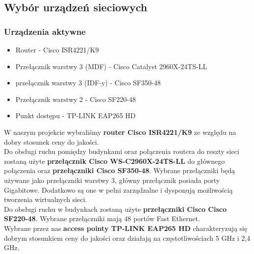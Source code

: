 \documentclass[a4paper,12pt]{extarticle}  %
\begin{document}
\subsection{Wybór urządzeń sieciowych}
\subsubsection{Urządzenia aktywne}
\begin{itemize}
	\item Router - Cisco ISR4221/K9
	\item Przełącznik warstwy 3 (MDF) - Cisco Catalyst 2960X-24TS-LL
	\item przełącznik warstwy 3 (IDF-y) - Cisco SF350-48
	\item Przełącznik warstwy 2 - Cisco SF220-48
	\item Punkt dostępu - TP-LINK EAP265 HD
\end{itemize}
W naszym projekcie wybraliśmy \textbf{router Cisco ISR4221/K9} ze względu na dobry stosunek 
ceny do jakości. \\

Do obsługi ruchu pomiędzy budynkami oraz połączenia routera do reszty sieci zostaną użyte 
\textbf{przełącznik Cisco WS-C2960X-24TS-LL} do głównego połączenia oraz \textbf{przełączniki Cisco SF350-48}. 
Wybrane przełączniki będą używane jako przełączniki warstwy 3, główny przełącznik posiada porty Gigabitowe.
Dodatkowo są one w pełni zarządzalne i dysponują możliwością tworzenia wirtualnych sieci.\\

Do obsługi ruchu w budynkach zostaną użyte \textbf{przełączniki Cisco Cisco SF220-48}.
Wybrane przełączniki mają 48 portów Fast Ethernet.\\

Wybrane przez nas \textbf{access pointy TP-LINK EAP265 HD} charakteryzują się dobrym stosunkiem ceny 
do jakości oraz działają na częstotliwościach 5 GHz i 2,4 GHz.







\end{document}
